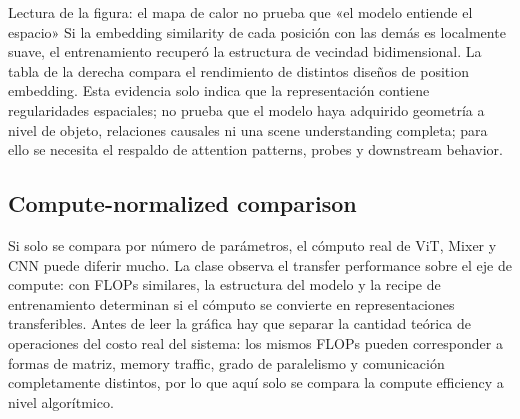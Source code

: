 
\begin{knowledgebox}{Lectura de la figura: el mapa de calor no prueba que «el modelo entiende el espacio»}
Si la embedding similarity de cada posición con las demás es localmente suave, el entrenamiento recuperó la estructura de vecindad bidimensional. La tabla de la derecha compara el rendimiento de distintos diseños de position embedding. Esta evidencia solo indica que la representación contiene regularidades espaciales; no prueba que el modelo haya adquirido geometría a nivel de objeto, relaciones causales ni una scene understanding completa; para ello se necesita el respaldo de attention patterns, probes y downstream behavior.
\end{knowledgebox}


\subsection{Compute-normalized comparison}

Si solo se compara por número de parámetros, el cómputo real de ViT, Mixer y CNN puede diferir mucho. La clase observa el transfer performance sobre el eje de compute: con FLOPs similares, la estructura del modelo y la recipe de entrenamiento determinan si el cómputo se convierte en representaciones transferibles. Antes de leer la gráfica hay que separar la cantidad teórica de operaciones del costo real del sistema: los mismos FLOPs pueden corresponder a formas de matriz, memory traffic, grado de paralelismo y comunicación completamente distintos, por lo que aquí solo se compara la compute efficiency a nivel algorítmico.


